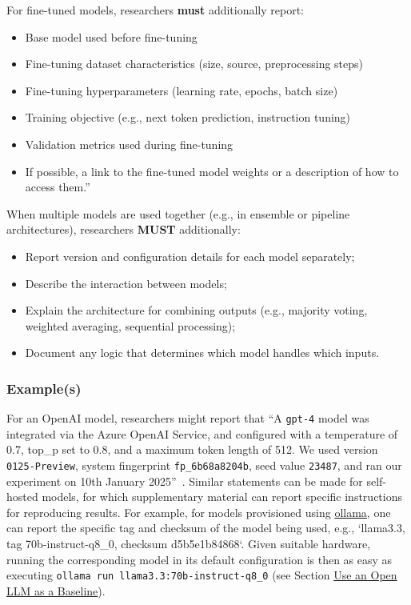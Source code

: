 For fine-tuned models, researchers \textbf{must} additionally report:
\begin{itemize}
\item Base model used before fine-tuning
\item Fine-tuning dataset characteristics (size, source, preprocessing steps)
\item Fine-tuning hyperparameters (learning rate, epochs, batch size)
\item Training objective (e.g., next token prediction, instruction tuning)
\item Validation metrics used during fine-tuning
\item If possible, a link to the fine-tuned model weights or a description of how to access them.''
\end{itemize}


When multiple models are used together (e.g., in ensemble or pipeline architectures), researchers \textbf{MUST} additionally:
\begin{itemize}
\item Report version and configuration details for each model separately;
\item Describe the interaction between models;
\item Explain the architecture for combining outputs (e.g., majority voting, weighted averaging, sequential processing);
\item Document any logic that determines which model handles which inputs.
\end{itemize}

\subsubsection{Example(s)}

For an OpenAI model, researchers might report that ``A  \texttt{gpt-4} model was integrated via the Azure OpenAI Service, and configured with a temperature of 0.7, top\_p set to 0.8, and a maximum token length of 512. We used version \texttt{0125-Preview}, system fingerprint \texttt{fp\_6b68a8204b}, seed value \texttt{23487}, and ran our experiment on 10th January 2025''~\cite{OpenAI25, Azure25}.
Similar statements can be made for self-hosted models, for which supplementary material can report specific instructions for reproducing results.
For example, for models provisioned using \href{https://ollama.com/library/}{ollama}, one can report the specific tag and checksum of the model being used, e.g., `llama3.3, tag 70b-instruct-q8\_0, checksum d5b5e1b84868`.
Given suitable hardware, running the corresponding model in its default configuration is then as easy as executing \texttt{ollama run llama3.3:70b-instruct-q8\_0} (see Section \href{/guidelines/#use-an-open-llm-as-a-baseline}{Use an Open LLM as a Baseline}).

